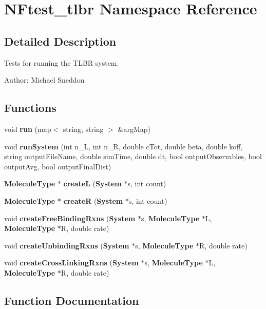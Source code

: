 \section{NFtest\_\-tlbr Namespace Reference}
\label{namespaceNFtest__tlbr}


\subsection{Detailed Description}
Tests for running the TLBR system. 

\begin{Desc}
\item[Author:]Michael Sneddon \end{Desc}




\subsection*{Functions}
\begin{CompactItemize}
\item 
void {\bf run} (map$<$ string, string $>$ \&argMap)
\item 
void {\bf runSystem} (int n\_\-L, int n\_\-R, double cTot, double beta, double koff, string outputFileName, double simTime, double dt, bool outputObservables, bool outputAvg, bool outputFinalDist)
\item 
{\bf MoleculeType} $\ast$ {\bf createL} ({\bf System} $\ast$s, int count)
\item 
{\bf MoleculeType} $\ast$ {\bf createR} ({\bf System} $\ast$s, int count)
\item 
void {\bf createFreeBindingRxns} ({\bf System} $\ast$s, {\bf MoleculeType} $\ast$L, {\bf MoleculeType} $\ast$R, double rate)
\item 
void {\bf createUnbindingRxns} ({\bf System} $\ast$s, {\bf MoleculeType} $\ast$R, double rate)
\item 
void {\bf createCrossLinkingRxns} ({\bf System} $\ast$s, {\bf MoleculeType} $\ast$L, {\bf MoleculeType} $\ast$R, double rate)
\end{CompactItemize}


\subsection{Function Documentation}
